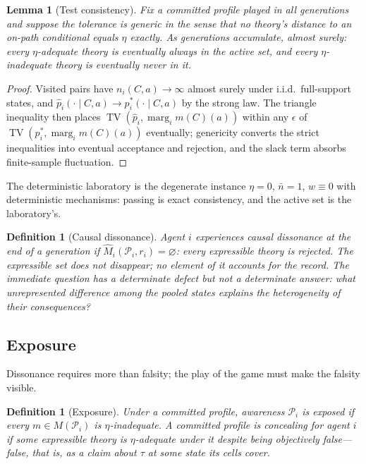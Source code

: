 \documentclass[11pt]{article}
\newtheorem{definition}[assumption]{Definition}
\newtheorem{lemma}[assumption]{Lemma}
\newcommand{\emptysetset}{\varnothing}
\newcommand{\TV}{\operatorname{TV}}
\newcommand{\marg}[1]{\operatorname{marg}_{#1}}
\begin{document}
\begin{lemma}[Test consistency]
\label{lem:test-consistency}
Fix a committed profile played in all generations and suppose the tolerance is
generic in the sense that no theory's distance to an on-path conditional
equals $\eta$ exactly.  As generations accumulate, almost surely: every
$\eta$-adequate theory is eventually always in the active set, and every
$\eta$-inadequate theory is eventually never in it.
\end{lemma}

\begin{proof}
Visited pairs have $n_i(C,a)\to\infty$ almost surely under i.i.d.\ full-support
states, and $\hat p_i(\cdot\mid C,a)\to p_i^{*}(\cdot\mid C,a)$ by the strong
law.  The triangle inequality then places
$\TV(\hat p_i,\marg{i}m(C)(a))$ within any $\epsilon$ of
$\TV(p_i^{*},\marg{i}m(C)(a))$ eventually; genericity converts the strict
inequalities into eventual acceptance and rejection, and the slack term
absorbs finite-sample fluctuation.
\end{proof}

The deterministic laboratory is the degenerate instance $\eta=0$, $\bar n=1$,
$w\equiv0$ with deterministic mechanisms: passing is exact consistency, and
the active set is the laboratory's.

\begin{definition}[Causal dissonance]
\label{def:dissonance}
Agent $i$ experiences \emph{causal dissonance} at the end of a generation if
$\widehat M_i(\mathcal P_i,r_i)=\emptysetset$: every expressible theory is
rejected.  The expressible set does not disappear; no element of it accounts
for the record.  The immediate question has a determinate defect but not a
determinate answer: what unrepresented difference among the pooled states
explains the heterogeneity of their consequences?
\end{definition}

\subsection{Exposure}

Dissonance requires more than falsity; the play of the game must make the
falsity visible.

\begin{definition}[Exposure]
\label{def:exposure}
Under a committed profile, awareness $\mathcal P_i$ is \emph{exposed} if every
$m\in M(\mathcal P_i)$ is $\eta$-inadequate.  A committed profile is
\emph{concealing} for agent $i$ if some expressible theory is
$\eta$-adequate under it despite being objectively false---false, that is, as
a claim about $\tau$ at some state its cells cover.
\end{definition}
\end{document}
